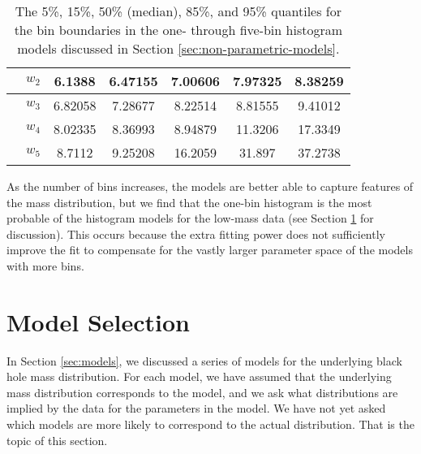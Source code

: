 \documentclass[preprint]{aastex}
\begin{document}
\begin{table}
\begin{center}
\begin{tabular}{|c|c|c|c|c|c|c|}
      \hline
        & $w_2$ & 6.1388 & 6.47155 & 7.00606 & 7.97325 & 8.38259 \\
      \hline
        & $w_3$ & 6.82058 & 7.28677 & 8.22514 & 8.81555 & 9.41012 \\
      \hline
        & $w_4$ & 8.02335 & 8.36993 & 8.94879 & 11.3206 & 17.3349 \\
      \hline
        & $w_5$ & 8.7112 & 9.25208 & 16.2059 & 31.897 & 37.2738 \\
      \hline
    \end{tabular}
  \end{center}
  \caption{\label{tab:low-mass-non-parametric} The 5\%, 15\%, 50\%
    (median), 85\%, and 95\% quantiles for the bin boundaries in the
    one- through five-bin histogram models discussed in Section
    \ref{sec:non-parametric-models}.}
\end{table}

As the number of bins increases, the models are better able to capture
features of the mass distribution, but we find that the one-bin
histogram is the most probable of the histogram models for the
low-mass data (see Section \ref{sec:model-selection} for discussion).
This occurs because the extra fitting power does not sufficiently
improve the fit to compensate for the vastly larger parameter space of
the models with more bins.

\section{Model Selection}
\label{sec:model-selection}

In Section \ref{sec:models}, we discussed a series of models for the
underlying black hole mass distribution.  For each model, we have
assumed that the underlying mass distribution corresponds to the
model, and we ask what distributions are implied by the data for the
parameters in the model.  We have not yet asked which models are more
likely to correspond to the actual distribution.  That is the topic of
this section.
\end{document}

